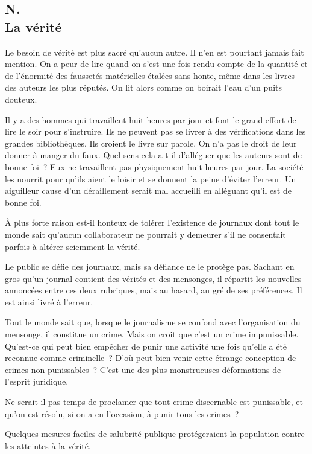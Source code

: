 \documentclass[french,twoside]{book} %
\begin{document}
\subsection[{N. La vérité}]{N. \\
La vérité}
\noindent \par
Le besoin de vérité est plus sacré qu'aucun autre. Il n'en est pourtant jamais fait mention. On a peur de lire quand on s'est une fois rendu compte de la quantité et de l'énormité des faussetés matérielles étalées sans honte, même dans les livres des auteurs les plus réputés. On lit alors comme on boirait l'eau d'un puits douteux.\par
Il y a des hommes qui travaillent huit heures par jour et font le grand effort de lire le soir pour s'instruire. Ils ne peuvent pas se livrer à des vérifications dans les grandes bibliothèques. Ils croient le livre sur parole. On n'a pas le droit de leur donner à manger du faux. Quel sens cela a-t-il d'alléguer que les auteurs sont de bonne foi ? Eux ne travaillent pas physiquement huit heures par jour. La société les nourrit pour qu'ils aient le loisir et se donnent la peine d'éviter l'erreur. Un aiguilleur cause d'un déraillement serait mal accueilli en alléguant qu'il est de bonne foi.\par
À plus forte raison est-il honteux de tolérer l'existence de journaux dont tout le monde sait qu'aucun collaborateur ne pourrait y demeurer s'il ne consentait parfois à altérer sciemment la vérité.\par
Le public se défie des journaux, mais sa défiance ne le protège pas. Sachant en gros qu'un journal contient des vérités et des mensonges, il répartit les nouvelles annoncées entre ces deux rubriques, mais au hasard, au gré de ses préférences. Il est ainsi livré à l'erreur.\par
Tout le monde sait que, lorsque le journalisme se confond avec l'organisation du mensonge, il constitue un crime. Mais on croit que c'est un crime impunissable. Qu'est-ce qui peut bien empêcher de punir une activité une fois qu'elle a été reconnue comme criminelle ? D'où peut bien venir cette étrange conception de crimes non punissables ? C'est une des plus monstrueuses déformations de l'esprit juridique.\par
Ne serait-il pas temps de proclamer que tout crime discernable est punissable, et qu'on est résolu, si on a en l'occasion, à punir tous les crimes ?\par
Quelques mesures faciles de salubrité publique protégeraient la population contre les atteintes à la vérité.\par
\end{document}
